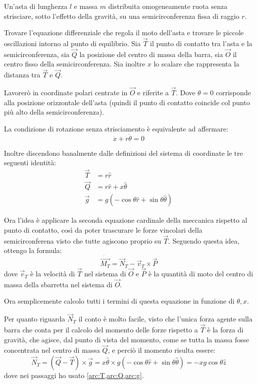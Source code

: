\documentclass[../main.tex]{subfiles}
\begin{document}

\textex
Un'asta di lunghezza $l$ e massa $m$ distribuita omogeneamente ruota senza strisciare, sotto l'effetto della gravità, su una semicirconferenza fissa di raggio $r$.

Trovare l'equazione differenziale che regola il moto dell'asta e trovare le piccole oscillazioni intorno al punto di equilibrio.
\solution
Sia $\vec T$ il punto di contatto tra l'asta e la semicirconferenza, sia $\vec Q$ la posizione del centro di massa della barra, sia $\vec O$ il centro fisso della semicirconferenza. Sia inoltre $x$ lo scalare che rappresenta la distanza tra $\vec T$ e $\vec Q$.

Lavorerò in coordinate polari centrate in $\vec O$ e riferite a $\vec T$. Dove $\theta=0$ corrisponde alla posizione orizzontale dell'asta (quindi il punto di contatto coincide col punto più alto della semicirconferenza).

La condizione di rotazione senza strisciamento è equivalente ad affermare:
\begin{equation}\label{arc:NoStrisciamento}
	\dot x + r\dot \theta = 0
\end{equation}

Inoltre discendono banalmente dalle definizioni del sistema di coordinate le tre seguenti identità:
\begin{align}
	\vec T &=r\hat r \label{arc:T}\\
	\vec Q &=r\hat r+x\hat{\theta} \label{arc:Q}\\
	\vec g &=g\left(-\cos\theta\hat r + \sin\theta \hat{\theta} \label{arc:g}\right)
\end{align}

Ora l'idea è applicare la seconda equazione cardinale della meccanica rispetto al punto di contatto, così da poter trascurare le forze vincolari della semicirconferena visto che tutte agiscono proprio su $\vec T$.
Seguendo questa idea, ottengo la formula:
\begin{equation}\label{arc:Cardine}
	\dot{\overrightarrow{M_T}}=\vec N_T - \vec v_T\times \vec P
\end{equation}
dove $\vec v_T$ è la velocità di $\vec T$ nel sistema di $\vec O$ e $\vec P$ è la quantità di moto del centro di massa della sbarretta nel sistema di $\vec O$.

Ora semplicemente calcolo tutti i termini di questa equazione in funzione di $\theta,x$.

Per quanto riguarda $\vec N_T$ il conto è molto facile, visto che l'unica forza agente sulla barra che conta per il calcolo del momento delle forze rispetto a $\vec T$ è la forza di gravità, che agisce, dal punto di vista del momento, come se tutta la massa fosse concentrata nel centro di massa $\vec Q$, e perciò il momento risulta essere:
\begin{equation} \label{arc:MomentoDelleForze}
	\vec N_T = (\vec Q-\vec T)\times \vec g = x\hat{\theta}\times g\left( -\cos\theta\hat r+\sin\theta \hat\theta \right)
	=-xg\cos\theta\hat z
\end{equation}
dove nei passaggi ho usato \cref{arc:T,arc:Q,arc:g}.
\end{document}
